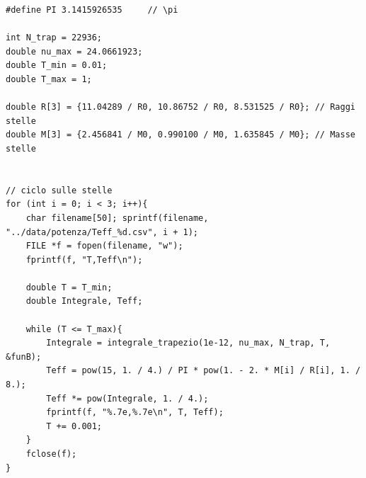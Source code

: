 \documentclass[a4paper, titlepage]{article}
\begin{document}
\begin{lstlisting}
#define PI 3.1415926535     // \pi

int N_trap = 22936;
double nu_max = 24.0661923;
double T_min = 0.01;
double T_max = 1;

double R[3] = {11.04289 / R0, 10.86752 / R0, 8.531525 / R0}; // Raggi stelle
double M[3] = {2.456841 / M0, 0.990100 / M0, 1.635845 / M0}; // Masse stelle


// ciclo sulle stelle
for (int i = 0; i < 3; i++){
    char filename[50]; sprintf(filename, "../data/potenza/Teff_%d.csv", i + 1);
    FILE *f = fopen(filename, "w");
    fprintf(f, "T,Teff\n");

    double T = T_min;
    double Integrale, Teff;

    while (T <= T_max){
        Integrale = integrale_trapezio(1e-12, nu_max, N_trap, T, &funB);
        Teff = pow(15, 1. / 4.) / PI * pow(1. - 2. * M[i] / R[i], 1. / 8.);
        Teff *= pow(Integrale, 1. / 4.);
        fprintf(f, "%.7e,%.7e\n", T, Teff);
        T += 0.001;
    }
    fclose(f);
}
\end{lstlisting}
\end{document}
